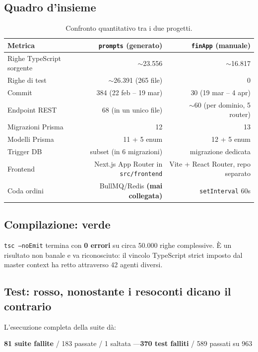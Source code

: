 \documentclass[11pt,a4paper]{article}
\newcommand{\ok}[1]{\textcolor{okgreen}{\textbf{#1}}}
\newcommand{\fail}[1]{\textcolor{failred}{\textbf{#1}}}
\newcommand{\file}[1]{\texttt{\small #1}}
\begin{document}
\subsection{Quadro d'insieme}

\begin{table}[h!]
\centering
\small
\begin{tabular}{lrr}
\toprule
\textbf{Metrica} & \textbf{\file{prompts} (generato)} & \textbf{\file{finApp} (manuale)} \\
\midrule
Righe TypeScript sorgente & $\sim$23.556 & $\sim$16.817 \\
Righe di test & $\sim$26.391 (265 file) & 0 \\
Commit & 384 (22 feb -- 19 mar) & 30 (19 mar -- 4 apr) \\
Endpoint REST & 68 (in un unico file) & $\sim$60 (per dominio, 5 router) \\
Migrazioni Prisma & 12 & 13 \\
Modelli Prisma & 11 + 5 enum & 12 + 5 enum \\
Trigger DB & subset (in 6 migrazioni) & migrazione dedicata \\
Frontend & Next.js App Router in \file{src/frontend} & Vite + React Router, repo separato \\
Coda ordini & BullMQ/Redis \fail{(mai collegata)} & \file{setInterval} 60s \\
\bottomrule
\end{tabular}
\caption{Confronto quantitativo tra i due progetti.}
\end{table}

\subsection{Compilazione: verde}
\file{tsc --noEmit} termina con \ok{0 errori} su circa 50.000 righe complessive. \`E un risultato non banale e va riconosciuto: il vincolo TypeScript strict imposto dal master context ha retto attraverso 42 agenti diversi.

\subsection{Test: rosso, nonostante i resoconti dicano il contrario}
L'esecuzione completa della suite d\`a:

\begin{center}
\fail{81 suite fallite} / 183 passate / 1 saltata \quad---\quad \fail{370 test falliti} / 589 passati su 963
\end{center}
\end{document}
